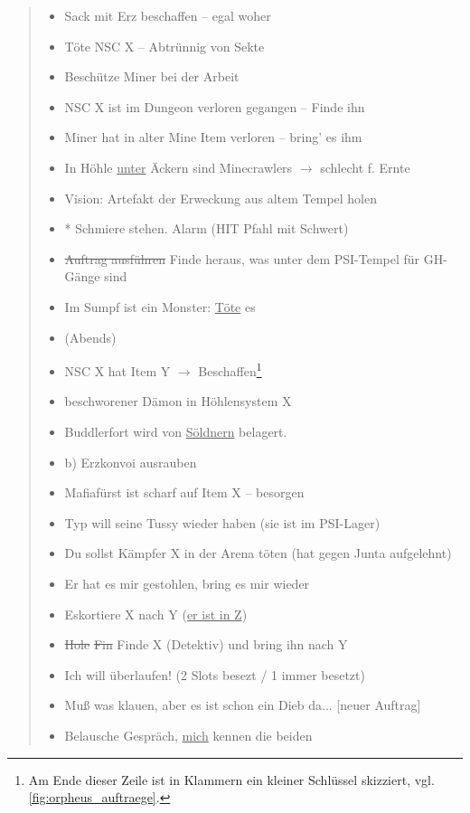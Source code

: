 \documentclass[a5paper,pagesize]{scrbook}
\begin{document}
\begin{quote}
   \begin{itemize}
      \item[1)] Sack mit Erz beschaffen -- egal woher
      \item[2)] Töte NSC X -- Abtrünnig von Sekte
      \item[3)] Beschütze Miner bei der Arbeit
      \item[4)] NSC X ist im Dungeon verloren gegangen -- Finde ihn
      \item[5)] Miner hat in alter Mine Item verloren -- bring' es ihm
      \item[6)] In Höhle \uline{unter} Äckern sind Minecrawlers $\rightarrow$ schlecht f. Ernte
      \item[7)] Vision: Artefakt der Erweckung aus altem Tempel holen
      \item[8)] * Schmiere stehen. Alarm (HIT Pfahl mit Schwert)
      \item[9)] \sout{Auftrag ausführen} Finde heraus, was unter dem PSI-Tempel für GH-Gänge sind
      \item[10)] Im Sumpf ist ein Monster: \uline{Töte} es
      \item[] \phantom{Im Sumpf ist} (Abends)
      \item[11)] NSC X hat Item Y $\rightarrow$ Beschaffen\footnote{Am Ende dieser Zeile ist in Klammern ein kleiner Schlüssel skizziert, vgl. \autoref{fig:orpheus_auftraege}.}
      \item[12)] beschworener Dämon in Höhlensystem X
      \item[13)] Buddlerfort wird von \uline{Söldnern} belagert.
      \item[] \phantom{B}b) Erzkonvoi ausrauben
      \item[14)] Mafiafürst ist scharf auf Item X -- besorgen
      \item[15)] Typ will seine Tussy wieder haben (sie ist im PSI-Lager)
      \item[16)] Du sollst Kämpfer X in der Arena töten (hat gegen Junta aufgelehnt)
      \item[17)] Er hat es mir gestohlen, bring es mir wieder
      \item[18)] Eskortiere X nach Y (\uline{er ist in Z})
      \item[19)] \sout{Hole} \sout{Fin} Finde X (Detektiv) und bring ihn nach Y
      \item[20)] Ich will überlaufen! (2 Slots besezt / 1 immer besetzt)
      \item[21)] Muß was klauen, aber es ist schon ein Dieb da... [neuer Auftrag]
      \item[22)] Belausche Gespräch, \uline{mich} kennen die beiden
   \end{itemize}
\end{quote}
\end{document}
